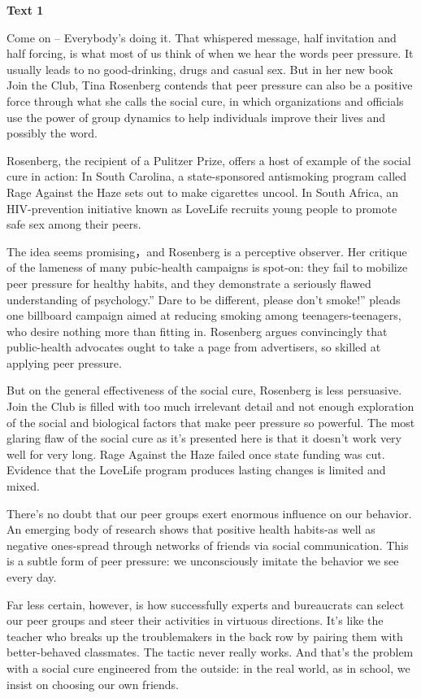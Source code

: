 \textbf{Text 1}

Come on -- Everybody’s doing it. That whispered message, half invitation and half forcing, is what most of us think of when we hear the words peer pressure. It usually leads to no good-drinking, drugs and casual sex. 
But in her new book Join the Club, Tina Rosenberg contends that peer pressure 
can also be a positive force through what she calls the social cure, in which organizations and officials use the power of group dynamics to help individuals improve their lives and possibly the word.

Rosenberg, the recipient of a Pulitzer Prize, offers a host of example of the social cure in action: In South Carolina, a state-sponsored antismoking program called Rage Against the Haze sets out to make cigarettes uncool. In South Africa, an HIV-prevention initiative known as LoveLife recruits young people to promote safe sex among their peers.

The idea seems promising，and Rosenberg is a perceptive observer. Her critique of the lameness of many pubic-health campaigns is spot-on: they fail to mobilize peer pressure for healthy habits, and they demonstrate a seriously flawed understanding of psychology.” Dare to be different, please don’t smoke!” pleads one billboard campaign aimed at reducing smoking among teenagers-teenagers, who desire nothing more than fitting in. Rosenberg argues convincingly that public-health advocates ought to take a page from advertisers, so skilled at applying peer pressure.

But on the general effectiveness of the social cure, Rosenberg is less persuasive. Join the Club is filled with too much irrelevant detail and not enough exploration of the social and biological factors that make peer pressure so powerful. The most glaring flaw of the social cure as it’s presented here is that it doesn’t work very well for very long. Rage Against the Haze failed once state funding was cut. Evidence that the LoveLife program produces lasting changes is limited and mixed.

There’s no doubt that our peer groups exert enormous influence on our behavior. An emerging body of research shows that positive health habits-as well as negative ones-spread through networks of friends via social communication. This is a subtle form of peer pressure: we unconsciously imitate the behavior we see every day.

Far less certain, however, is how successfully experts and bureaucrats can select our peer groups and steer their activities in virtuous directions. It’s like the teacher who breaks up the troublemakers in the back row by pairing them with better-behaved classmates. The tactic never really works. And that’s the problem with a social cure engineered from the outside: in the real world, as in school, we insist on choosing our own friends.

